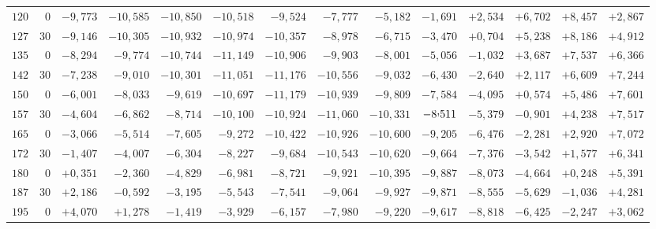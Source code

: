 \begin{landscape}
\begin{longtable}{@{}rr|r|r|r|r|r|r|r|r|r|r|r|r@{}}
\(120\) & \(0\) & \(-9{,}773\) & \(-10{,}585\) & \(-10{,}850\) & \(-10{,}518\) & \(-9{,}524\) & \(-7{,}777\) & \(-5{,}182\) & \(-1{,}691\) & \(+2{,}534\) & \(+6{,}702\) & \(+8{,}457\) & \(+2{,}867\)\\
\(127\) & \(30\) & \(-9{,}146\) & \(-10{,}305\) & \(-10{,}932\) & \(-10{,}974\) & \(-10{,}357\) & \(-8{,}978\) & \(-6{,}715\) & \(-3{,}470\) & \(+0{,}704\) & \(+5{,}238\) & \(+8{,}186\) & \(+4{,}912\)\\
\(135\) & \(0\) & \(-8{,}294\) & \(-9{,}774\) & \(-10{,}744\) & \(-11{,}149\) & \(-10{,}906\) & \(-9{,}903\) & \(-8{,}001\) & \(-5{,}056\) & \(-1{,}032\) & \(+3{,}687\) & \(+7{,}537\) & \(+6{,}366\)\\
\(142\) & \(30\) & \(-7{,}238\) & \(-9{,}010\) & \(-10{,}301\) & \(-11{,}051\) & \(-11{,}176\) & \(-10{,}556\) & \(-9{,}032\) & \(-6{,}430\) & \(-2{,}640\) & \(+2{,}117\) & \(+6{,}609\) & \(+7{,}244\)\\[2pt]
\(150\) & \(0\) & \(-6{,}001\) & \(-8{,}033\) & \(-9{,}619\) & \(-10{,}697\) & \(-11{,}179\) & \(-10{,}939\) & \(-9{,}809\) & \(-7{,}584\) & \(-4{,}095\) & \(+0{,}574\) & \(+5{,}486\) & \(+7{,}601\)\\
\(157\) & \(30\) & \(-4{,}604\) & \(-6{,}862\) & \(-8{,}714\) & \(-10{,}100\) & \(-10{,}924\) & \(-11{,}060\) & \(-10{,}331\) & \(-8\mathord{\raisebox{0.65ex}{,}}511\) & \(-5{,}379\) & \(-0{,}901\) & \(+4{,}238\) & \(+7{,}517\)\\
\(165\) & \(0\) & \(-3{,}066\) & \(-5{,}514\) & \(-7{,}605\) & \(-9{,}272\) & \(-10{,}422\) & \(-10{,}926\) & \(-10{,}600\) & \(-9{,}205\) & \(-6{,}476\) & \(-2{,}281\) & \(+2{,}920\) & \(+7{,}072\)\\
\(172\) & \(30\) & \(-1{,}407\) & \(-4{,}007\) & \(-6{,}304\) & \(-8{,}227\) & \(-9{,}684\) & \(-10{,}543\) & \(-10{,}620\) & \(-9{,}664\) & \(-7{,}376\) & \(-3{,}542\) & \(+1{,}577\) & \(+6{,}341\)\\[2pt]
\(180\) & \(0\) & \(+0{,}351\) & \(-2{,}360\) & \(-4{,}829\) & \(-6{,}981\) & \(-8{,}721\) & \(-9{,}921\) & \(-10{,}395\) & \(-9{,}887\) & \(-8{,}073\) & \(-4{,}664\) & \(+0{,}248\) & \(+5{,}391\)\\
\(187\) & \(30\) & \(+2{,}186\) & \(-0{,}592\) & \(-3{,}195\) & \(-5{,}543\) & \(-7{,}541\) & \(-9{,}064\) & \(-9{,}927\) & \(-9{,}871\) & \(-8{,}555\) & \(-5{,}629\) & \(-1{,}036\) & \(+4{,}281\)\\
\(195\) & \(0\) & \(+4{,}070\) & \(+1{,}278\) & \(-1{,}419\) & \(-3{,}929\) & \(-6{,}157\) & \(-7{,}980\) & \(-9{,}220\) & \(-9{,}617\) & \(-8{,}818\) & \(-6{,}425\) & \(-2{,}247\) & \(+3{,}062\)\\

\end{longtable}
\end{landscape}
